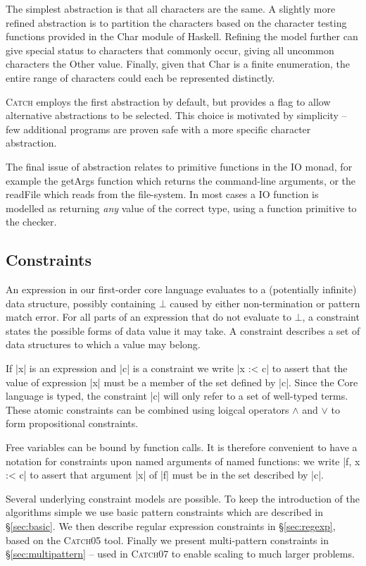 \documentclass[preprint]{sigplanconf}
\newcommand{\C}[1]{\textsf{#1}}
\newcommand{\catch}{\textsc{Catch}}
\begin{document}
The simplest abstraction is that all characters are the same. A slightly more refined abstraction is to partition the characters based on the character testing functions provided in the \C{Char} module of Haskell. Refining the model further can give special status to characters that commonly occur, giving all uncommon characters the \C{Other} value. Finally, given that \C{Char} is a finite enumeration, the entire range of characters could each be represented distinctly.

\catch{} employs the first abstraction by default, but provides a flag to allow alternative abstractions to be selected. This choice is motivated by simplicity -- few additional programs are proven safe with a more specific character abstraction.

The final issue of abstraction relates to primitive functions in the \C{IO} monad, for example the \C{getArgs} function which returns the command-line arguments, or the \C{readFile} which reads from the file-system. In most cases a IO function is modelled as returning \textit{any} value of the correct type, using a function primitive to the checker.


\subsection{Constraints}
\label{sec:constraints}

An expression in our first-order core language evaluates to a (potentially infinite) data structure, possibly containing $\bot{}$ caused by either non-termination or pattern match error. For all parts of an expression that do not evaluate to $\bot{}$, a constraint states the possible forms of data value it may take. A constraint describes a set of data structures to which a value may belong.

If |x| is an expression and |c| is a constraint we write |x :< c| to assert that the value of expression |x| must be a member of the set defined by |c|. Since the Core language is typed, the constraint |c| will only refer to a set of well-typed terms. These atomic constraints can be combined using loigcal operators $\wedge{}$ and $\vee{}$ to form propositional constraints.

Free variables can be bound by function calls. It is therefore convenient to have a notation for constraints upon named arguments of named functions: we write |f, x :< c| to assert that argument |x| of |f| must be in the set described by |c|.

Several underlying constraint models are possible. To keep the introduction of the algorithms simple we use basic pattern constraints which are described in \S\ref{sec:basic}. We then describe regular expression constraints in \S\ref{sec:regexp}, based on the \catch05 tool. Finally we present multi-pattern constraints in \S\ref{sec:multipattern} -- used in \catch07 to enable scaling to much larger problems.
\end{document}

